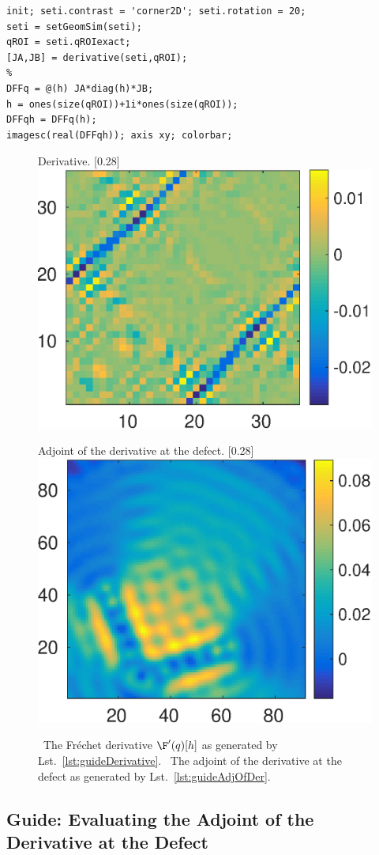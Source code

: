 \documentclass[a4paper]{article}
\begin{document}
\begin{lstlisting}[caption={Compute the Fr\'{e}chet derivative {$\F'(q)[h]$} (\emph{source code}: \textsf{guides/guideDerivative.m}).},label=lst:guideDerivative]
init; seti.contrast = 'corner2D'; seti.rotation = 20;
seti = setGeomSim(seti);
qROI = seti.qROIexact;
[JA,JB] = derivative(seti,qROI);
%
DFFq = @(h) JA*diag(h)*JB;
h = ones(size(qROI))+1i*ones(size(qROI));
DFFqh = DFFq(h);
imagesc(real(DFFqh)); axis xy; colorbar;
\end{lstlisting}

\begin{figure}
\centering
\begin{subcaptionbox}{Derivative.
  \label{fig:guide:derivative}}[0.28\textwidth]{
  \includegraphics[height=0.22\textwidth]{figs/fig_guideDerivative}
  }
\end{subcaptionbox}
\begin{subcaptionbox}{Adjoint of the derivative at the defect.
  \label{fig:guide:adjOfDer}}[0.28\textwidth]{
   \includegraphics[height=0.22\textwidth]{figs/fig_guideAdjOfDer}
  }
\end{subcaptionbox}
\caption{~The Fr\'{e}chet derivative $\F'(q)[h]$ as generated by Lst.~\ref{lst:guideDerivative}. 
~The adjoint of the derivative at the defect as generated by Lst.~\ref{lst:guideAdjOfDer}.}
\label{fig:guide:derivativeAndAdjOfDer}
\end{figure}


\subsection{Guide: Evaluating the Adjoint of the Derivative at the Defect}\label{sec:guide:adjOfDer}
\end{document}
